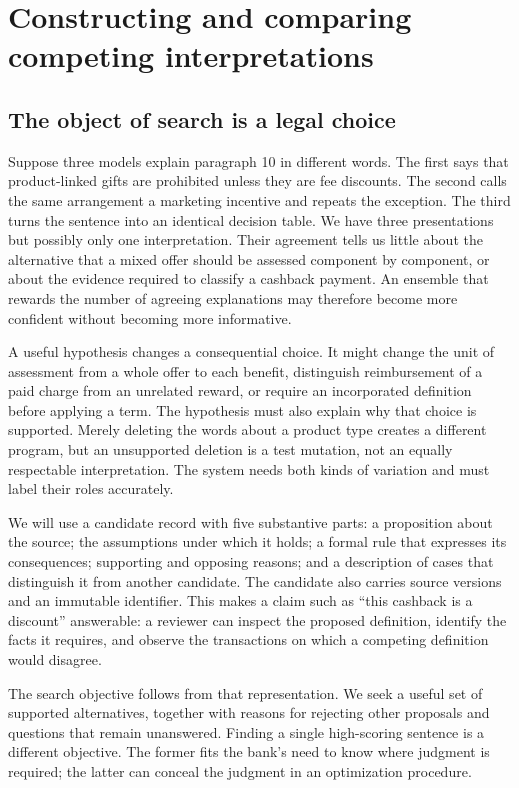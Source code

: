 \documentclass[12pt,a4paper,oneside,openany]{book}
\begin{document}
\chapter{Constructing and comparing competing interpretations}
\label{ch:search}

\section{The object of search is a legal choice}

Suppose three models explain paragraph 10 in different words. The first says that
product-linked gifts are prohibited unless they are fee discounts. The second
calls the same arrangement a marketing incentive and repeats the exception. The
third turns the sentence into an identical decision table. We have three
presentations but possibly only one interpretation. Their agreement tells us
little about the alternative that a mixed offer should be assessed component by
component, or about the evidence required to classify a cashback payment. An
ensemble that rewards the number of agreeing explanations may therefore become
more confident without becoming more informative.

A useful hypothesis changes a consequential choice. It might change the unit of
assessment from a whole offer to each benefit, distinguish reimbursement of a
paid charge from an unrelated reward, or require an incorporated definition
before applying a term. The hypothesis must also explain why that choice is
supported. Merely deleting the words about a product type creates a different
program, but an unsupported deletion is a test mutation, not an equally
respectable interpretation. The system needs both kinds of variation and must
label their roles accurately.

We will use a candidate record with five substantive parts: a proposition about
the source; the assumptions under which it holds; a formal rule that expresses
its consequences; supporting and opposing reasons; and a description of cases
that distinguish it from another candidate. The candidate also carries source
versions and an immutable identifier. This makes a claim such as ``this cashback
is a discount'' answerable: a reviewer can inspect the proposed definition,
identify the facts it requires, and observe the transactions on which a competing
definition would disagree.

The search objective follows from that representation. We seek a useful set of
supported alternatives, together with reasons for rejecting other proposals and
questions that remain unanswered. Finding a single high-scoring sentence is a
different objective. The former fits the bank's need to know where judgment is
required; the latter can conceal the judgment in an optimization procedure.
\end{document}
